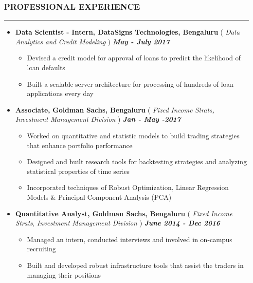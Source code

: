 \documentclass[10pt,a4paper,English]{article}
\newcommand\roottitle[1]{\vspace{-4mm}\subsubsection*{\uppercase{#1}}\vspace{-0.3em}\nopagebreak[4]\hrule\vspace{4mm}}
\newcommand\itemyear[1]{\hfill \textbf{\emph{\color{itemyear} #1}}}
\newcommand\itemenv{\setlength\itemsep{0.5pt} \addtolength{\itemindent}{-5mm}\vspace{-1.5mm}}
\begin{document}
\vspace{1.5mm}

\roottitle{Professional Experience}
\begin{itemize} \itemenv

    \item \textbf{Data Scientist - Intern, DataSigns Technologies, Bengaluru } \hfill({\emph{ Data Analytics and Credit Modeling }}) \itemyear{May - July 2017}
        \begin{itemize} \itemenv
            \item Devised a credit model for approval of loans to predict the likelihood of loan defaults
            \item Built a scalable server architecture for processing of hundreds of loan applications every day
        \end{itemize}

    \item \textbf{Associate, Goldman Sachs, Bengaluru} \hfill (\emph{ Fixed Income Strats, Investment Management Division }) \itemyear{Jan - May -2017}
        \begin{itemize} \itemenv
            \item Worked on quantitative and statistic models to build trading strategies that enhance portfolio performance
            \item Designed and built research tools for backtesting strategies and analyzing statistical properties of time series
            \item Incorporated techniques of Robust Optimization, Linear Regression Models \& Principal Component Analysis (PCA)
        \end{itemize}

    \item \textbf{Quantitative Analyst, Goldman Sachs, Bengaluru} \hfill (\emph{ Fixed Income Strats, Investment Management Division }) \itemyear{June 2014 - Dec 2016}
        \begin{itemize} \itemenv 
            \item Managed an intern, conducted interviews and involved in on-campus recruiting
            \item Built and developed robust infrastructure tools that assist the traders in managing their positions
        \end{itemize}


\end{itemize}
\end{document}
